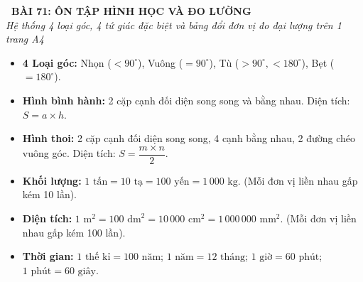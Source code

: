 \documentclass[14pt,a4paper,oneside]{extbook}
\begin{document}
\noindent
\begin{tcolorbox}[
  enhanced,
  colback=teal!8!white,
  colframe=teal!80!black,
  arc=3mm, boxrule=1pt,
  left=3mm, right=3mm, top=2mm, bottom=2mm,
  halign=center
]
  {\Large\bfseries\color{teal!90!black}\faBookmark\ BÀI 71: ÔN TẬP HÌNH HỌC VÀ ĐO LƯỜNG}\\[1.5pt]
  {\footnotesize\itshape\color{black!75} Hệ thống 4 loại góc, 4 tứ giác đặc biệt và bảng đổi đơn vị đo đại lượng trên 1 trang A4}
\end{tcolorbox}

\vspace{-2.5mm}

\noindent
\begin{minipage}[t]{0.49\textwidth}\vspace{0pt}
\begin{tcolorbox}[
  enhanced,
  colback=blue!4!white,
  colframe=blue!75!black,
  arc=2mm, boxrule=0.8pt,
  left=2mm, right=2mm, top=1.8mm, bottom=1.8mm,
  title={\footnotesize\bfseries\color{white}\faSquareO\ 1. Trọng tâm hình học}
]
{\footnotesize
\begin{itemize}\setlength{\itemsep}{1pt}\setlength{\leftskip}{-2.5mm}
  \item \textbf{4 Loại góc:} Nhọn ($<90^\circ$), Vuông ($=90^\circ$), Tù ($>90^\circ, <180^\circ$), Bẹt ($=180^\circ$).
  \item \textbf{Hình bình hành:} 2 cặp cạnh đối diện song song và bằng nhau. Diện tích: $S = a \times h$.
  \item \textbf{Hình thoi:} 2 cặp cạnh đối diện song song, 4 cạnh bằng nhau, 2 đường chéo vuông góc. Diện tích: $S = \dfrac{m \times n}{2}$.
\end{itemize}
}
\end{tcolorbox}
\end{minipage}
\hfill
\begin{minipage}[t]{0.49\textwidth}\vspace{0pt}
\begin{tcolorbox}[
  enhanced,
  colback=teal!4!white,
  colframe=teal!75!black,
  arc=2mm, boxrule=0.8pt,
  left=2mm, right=2mm, top=1.8mm, bottom=1.8mm,
  title={\footnotesize\bfseries\color{white}\faClockO\ 2. Trọng tâm đo lường}
]
{\footnotesize
\begin{itemize}\setlength{\itemsep}{1.5pt}\setlength{\leftskip}{-2.5mm}
  \item \textbf{Khối lượng:} $1\text{ tấn} = 10\text{ tạ} = 100\text{ yến} = 1\,000\text{ kg}$. (Mỗi đơn vị liền nhau gấp kém 10 lần).
  \item \textbf{Diện tích:} $1\text{ m}^2 = 100\text{ dm}^2 = 10\,000\text{ cm}^2 = 1\,000\,000\text{ mm}^2$. (Mỗi đơn vị liền nhau gấp kém 100 lần).
  \item \textbf{Thời gian:} $1\text{ thế kỉ} = 100\text{ năm}$; $1\text{ năm} = 12\text{ tháng}$; $1\text{ giờ} = 60\text{ phút}$; $1\text{ phút} = 60\text{ giây}$.
\end{itemize}
}
\end{tcolorbox}
\end{minipage}
\end{document}
